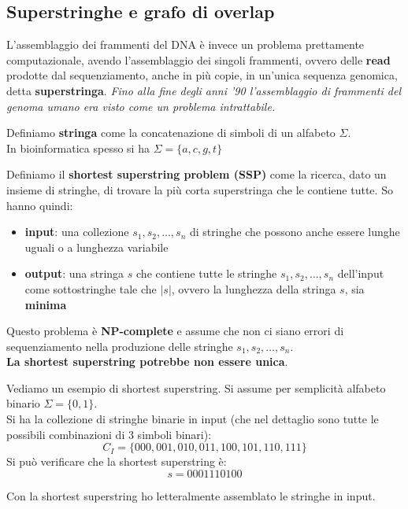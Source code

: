 \documentclass[a4paper,12pt, oneside]{book}
\begin{document}
\subsection{Superstringhe e grafo di overlap}
L'assemblaggio dei frammenti del DNA è invece un problema prettamente
computazionale, avendo l'assemblaggio dei singoli frammenti, ovvero delle
\textbf{read} prodotte dal sequenziamento, anche in più copie, in un'unica
sequenza genomica, detta \textbf{superstringa}. \textit{Fino alla fine degli
  anni '90 l'assemblaggio di frammenti del genoma umano era visto come un
  problema intrattabile.}
\begin{definizione}
  Definiamo \textbf{stringa} come la concatenazione di simboli di un alfabeto
  $\Sigma$.\\
  In bioinformatica spesso si ha $\Sigma=\{a,c,g,t\}$
\end{definizione}
\begin{definizione}
  Definiamo il \textbf{shortest superstring problem (SSP)} come la ricerca,
  dato un insieme di stringhe, di trovare la più corta superstringa che le
  contiene tutte. So hanno quindi:
  \begin{itemize}
    \item \textbf{input}: una collezione $s_1,s_2,\ldots,s_n$ di stringhe che
    possono anche essere lunghe uguali o a lunghezza variabile
    \item \textbf{output}: una stringa $s$ che contiene tutte le stringhe
    $s_1,s_2,\ldots,s_n$ dell'input come sottostringhe tale che $|s|$, ovvero la
    lunghezza della stringa $s$, sia \textbf{minima}
  \end{itemize}
  Questo problema è \textbf{NP-complete} e assume che non ci siano errori di
  sequenziamento nella produzione delle stringhe $s_1,s_2,\ldots,s_n$.\\
  \textbf{La shortest superstring potrebbe non essere unica}.
\end{definizione}
\begin{esempio}
  Vediamo un esempio di shortest superstring. Si assume per semplicità alfabeto
  binario $\Sigma=\{0,1\}$.\\
  Si ha la collezione di stringhe binarie in input (che nel dettaglio sono tutte
  le possibili combinazioni di 3 simboli binari):
  \[C_I=\{000,001,010,011,100,101,110,111\}\]
  Si può verificare che la shortest superstring è:
  \[s=0001110100\]
\end{esempio}
Con la shortest superstring ho letteralmente assemblato le stringhe in input.\\
\end{document}
